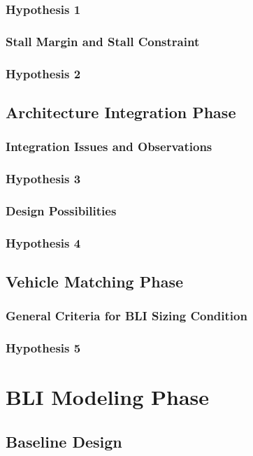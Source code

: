 \documentclass[12pt]{gatech-thesis}
\begin{document}
\subsection{Hypothesis 1}

\subsection{Stall Margin and Stall Constraint}
\subsection{Hypothesis 2}

\section{Architecture Integration Phase}
\subsection{Integration Issues and Observations}
\subsection{Hypothesis 3}
\subsection{Design Possibilities}
\subsection{Hypothesis 4}

\section{Vehicle Matching Phase}
\subsection{General Criteria for BLI Sizing Condition}
\subsection{Hypothesis 5}

\chapter{BLI Modeling Phase}

\section{Baseline Design}
\end{document}
